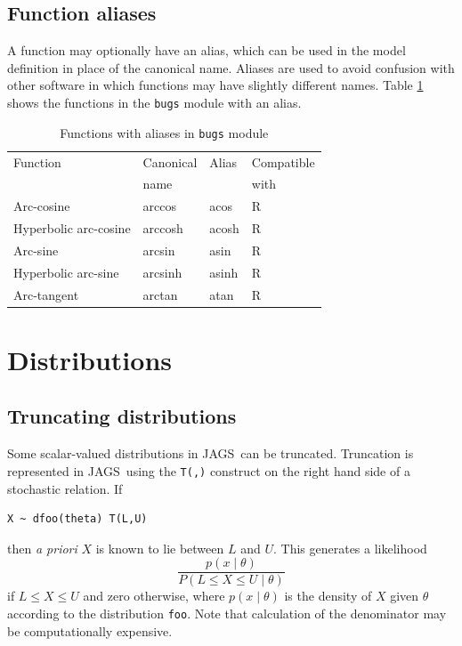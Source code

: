 \documentclass[11pt, a4paper, titlepage]{report}
\newcommand{\JAGS}{\textsf{JAGS}}
\begin{document}
\section{Function aliases}

A function may optionally have an alias, which can be used in the
model definition in place of the canonical name. Aliases are used to
avoid confusion with other software in which functions may have
slightly different names. Table \ref{table:bugs:functions:alias} shows
the functions in the \texttt{bugs} module with an alias.

\begin{table}
\begin{center}
\begin{tabular}{llll}
\hline
Function               & Canonical & Alias & Compatible  \\
                       & name      &       & with         \\
\hline
Arc-cosine             & arccos    & acos  & R \\
Hyperbolic arc-cosine  & arccosh   & acosh & R \\
Arc-sine               & arcsin    & asin  & R \\
Hyperbolic arc-sine    & arcsinh   & asinh & R \\
Arc-tangent            & arctan    & atan  & R \\
\hline
\end{tabular}
\caption{Functions with aliases in \texttt{bugs} module
  \label{table:bugs:functions:alias}}
\end{center}
\end{table}

\chapter{Distributions}
\label{chapter:distributions}

\section{Truncating distributions}
\label{section:truncation}

Some scalar-valued distributions in \JAGS\ can be truncated.
Truncation is represented in \JAGS\ using the \texttt{T(,)}
construct on the right hand side of a stochastic relation. If
\begin{verbatim}
X ~ dfoo(theta) T(L,U)
\end{verbatim}
then {\em a priori} $X$ is known to lie between $L$ and $U$. This
generates a likelihood
\[
\frac{p(x \mid \theta)}{P(L \leq X \leq U \mid \theta)}
\]
if $L \leq X \leq U$ and zero otherwise, where $p(x \mid \theta)$ is
the density of $X$ given $\theta$ according to the distribution
\texttt{foo}. Note that calculation of the denominator may be
computationally expensive.
\end{document}
